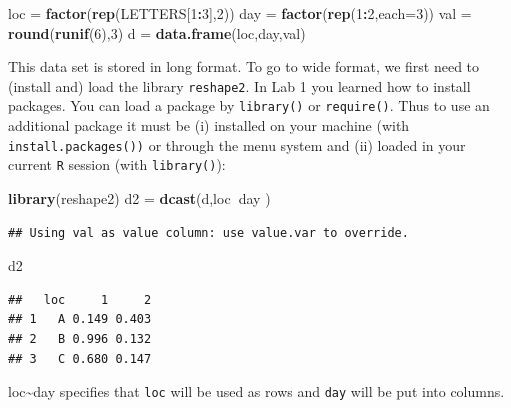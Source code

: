 \documentclass[11pt,]{article}
\newenvironment{Shaded}{\begin{snugshade}}{\end{snugshade}}
\newcommand{\KeywordTok}[1]{\textcolor[rgb]{0.13,0.29,0.53}{\textbf{#1}}}
\newcommand{\DataTypeTok}[1]{\textcolor[rgb]{0.13,0.29,0.53}{#1}}
\newcommand{\DecValTok}[1]{\textcolor[rgb]{0.00,0.00,0.81}{#1}}
\newcommand{\StringTok}[1]{\textcolor[rgb]{0.31,0.60,0.02}{#1}}
\newcommand{\OperatorTok}[1]{\textcolor[rgb]{0.81,0.36,0.00}{\textbf{#1}}}
\newcommand{\NormalTok}[1]{#1}
\begin{document}
\begin{Shaded}
\begin{Highlighting}[]
\NormalTok{loc =}\StringTok{ }\KeywordTok{factor}\NormalTok{(}\KeywordTok{rep}\NormalTok{(LETTERS[}\DecValTok{1}\OperatorTok{:}\DecValTok{3}\NormalTok{],}\DecValTok{2}\NormalTok{))}
\NormalTok{day =}\StringTok{ }\KeywordTok{factor}\NormalTok{(}\KeywordTok{rep}\NormalTok{(}\DecValTok{1}\OperatorTok{:}\DecValTok{2}\NormalTok{,}\DataTypeTok{each=}\DecValTok{3}\NormalTok{))}
\NormalTok{val =}\StringTok{ }\KeywordTok{round}\NormalTok{(}\KeywordTok{runif}\NormalTok{(}\DecValTok{6}\NormalTok{),}\DecValTok{3}\NormalTok{)}
\NormalTok{d =}\StringTok{ }\KeywordTok{data.frame}\NormalTok{(loc,day,val)}
\end{Highlighting}
\end{Shaded}

This data set is stored in long format. To go to wide format, we first
need to (install and) load the library \texttt{reshape2}. In Lab 1 you
learned how to install packages. You can load a package by
\texttt{library()} or \texttt{require()}. Thus to use an additional
package it must be (i) installed on your machine (with
\texttt{install.packages())} or through the menu system and (ii) loaded
in your current \texttt{R} session (with \texttt{library()}):

\begin{Shaded}
\begin{Highlighting}[]
\KeywordTok{library}\NormalTok{(reshape2)  }
\NormalTok{d2 =}\StringTok{ }\KeywordTok{dcast}\NormalTok{(d,loc}\OperatorTok{~}\NormalTok{day )}
\end{Highlighting}
\end{Shaded}

\begin{verbatim}
## Using val as value column: use value.var to override.
\end{verbatim}

\begin{Shaded}
\begin{Highlighting}[]
\NormalTok{d2}
\end{Highlighting}
\end{Shaded}

\begin{verbatim}
##   loc     1     2
## 1   A 0.149 0.403
## 2   B 0.996 0.132
## 3   C 0.680 0.147
\end{verbatim}

loc\textasciitilde{}day specifies that \texttt{loc} will be used as rows
and \texttt{day} will be put into columns.
\end{document}

